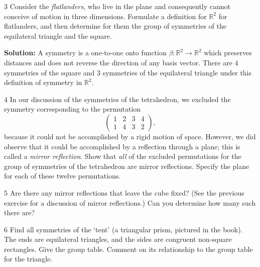 \begin{problem}{3}
    Consider the \emph{flatlanders}, who live in the plane 
    and consequently cannot conceive of motion in three dimensions.
    Formulate a definition for $\mathbb{R}^2$ for flatlanders,
    and then determine for them the group of symmetries 
    of the equilateral triangle and the square.
\end{problem}
\solved

\textbf{Solution:}
A symmetry is a one-to-one onto function $\beta : \mathbb{R}^2 \longrightarrow \mathbb{R}^2$
    which preserves distances and does not reverse the direction of any basis vector.
There are $4$ symmetries of the square and $3$ symmetries of the equilateral triangle 
under this definition of symmetry in $\mathbb{R}^2$.

\begin{problem}{4}
    In our discussion of the symmetries of the tetrahedron, we excluded the symmetry
    corresponding to the permutation
    \[\begin{pmatrix} 1 & 2 & 3 & 4 \\ 1 & 4 & 3 & 2 \end{pmatrix},\]
    because it could not be accomplished by a rigid motion of space. However, we did
    observe that it could be accomplished by a reflection through a plane; this is called
    a \emph{mirror reflection}. Show that \emph{all} of the excluded permutations for the
    group of symmetries of the tetrahedron are mirror reflections. Specify the plane for
    each of these twelve permutations.
\end{problem}
\unsolved

\begin{problem}{5}
    Are there any mirror reflections that leave the cube fixed? (See the previous exercise
    for a discussion of mirror reflections.) Can you determine how many such there are?
\end{problem}
\unsolved

\begin{problem}{6}
    Find all symmetries of the `tent' (a triangular prism, pictured in the book). The ends
    are equilateral triangles, and the sides are congruent non-square rectangles. Give the
    group table. Comment on its relationship to the group table for the triangle.
\end{problem}
\unsolved

